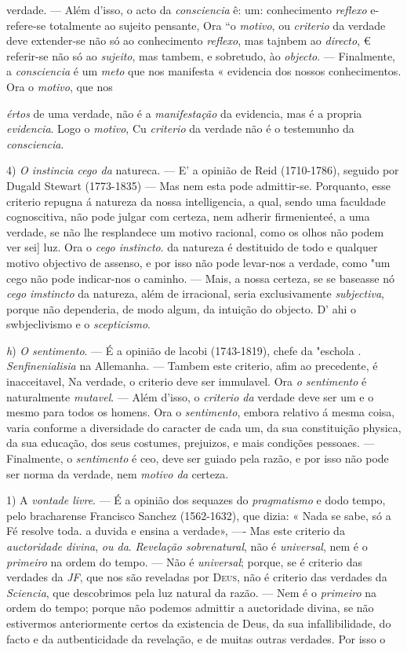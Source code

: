 verdade. --- Além d'isso, o acto da \emph{consciencia} ê: um: conhecimento \emph{reflexo} e-refere-se totalmente ao sujeito pensante, Ora “o \emph{motivo}, ou \emph{criterio} da verdade deve extender-se não só ao conhecimento \emph{reflexo}, mas tajnbem ao \emph{directo}, € referir-se não só ao \emph{sujeito}, mas tambem, e sobretudo, ào \emph{objecto}. --- Finalmente, a \emph{consciencia} é um \emph{meto} que nos manifesta « evidencia dos nossos conhecimentos. Ora o \emph{motivo}, que nos\par \emph{értos} de uma verdade, não é a \emph{manifestação} da evidencia, mas é a propria \emph{evidencia}. Logo o \emph{motivo}, Cu \emph{criterio} da verdade não é o testemunho da \emph{consciencia}.\par 4) \emph{O instincia cego da} natureca. --- E' a opinião de Reid (1710-1786), seguido por Dugald Stewart (1773-1835) --- Mas nem esta pode admittir-se. Porquanto, esse criterio repugna á natureza da nossa intelligencia, a qual, sendo uma faculdade cognoscitiva, não pode julgar com certeza, nem adherir firmenienteé, a uma verdade, se não lhe resplandece um motivo racional, como os olhos não podem ver sei] luz. Ora o \emph{cego instincto}. da natureza é destituido de todo e qualquer motivo objectivo de assenso, e por isso não pode levar-nos a verdade, como "um cego não pode indicar-nos o caminho. --- Mais, a nossa certeza, se se baseasse nó \emph{cego imstincto} da natureza, além de irracional, seria exclusivamente \emph{subjectiva}, porque não dependeria, de modo algum, da intuição do objecto. D' ahi o swbjeclivismo e o \emph{scepticismo}.\par \emph{h}) \emph{O sentimento}. --- É a opinião de lacobi (1743-1819), chefe da "eschola . \emph{Senfinenialisia} na Allemanha. --- Tambem este criterio, afim ao precedente, é inacceitavel, Na verdade, o criterio deve ser immulavel. Ora \emph{o sentimento} é naturalmente \emph{mutavel}. --- Além d'isso, o \emph{criterio da} verdade deve ser um e o mesmo para todos os homens. Ora o \emph{sentimento}, embora relativo á mesma coisa, varia conforme a diversidade do caracter de cada um, da sua constituição physica, da sua educação, dos seus costumes, prejuizos, e mais condições pessoaes. --- Finalmente, o \emph{sentimento} é ceo, deve ser guiado pela razão, e por isso não pode ser norma da verdade, nem \emph{motivo da} certeza.\par 1) A \emph{vontade livre}. --- É a opinião dos sequazes do \emph{pragmatismo} e dodo tempo, pelo bracharense Francisco Sanchez (1562-1632), que dizia: « Nada se sabe, só a Fé resolve toda. a duvida e ensina a verdade», ---- Mas este criterio da \emph{auctoridade divina}, \emph{ou da}. \emph{Revelação sobrenatural}, não é \emph{universal}, nem é o \emph{primeiro} na ordem do tempo. --- Não é \emph{universal}; porque, se é criterio das verdades da \emph{JF}, que nos são reveladas por \textsc{Deus}, não é criterio das verdades da \emph{Sciencia}, que descobrimos pela luz natural da razão. --- Nem é o \emph{primeiro} na ordem do tempo; porque não podemos admittir a auctoridade divina, se não estivermos anteriormente certos da existencia de Deus, da sua infallibilidade, do facto e da autbenticidade da revelação, e de muitas outras verdades. Por isso o 